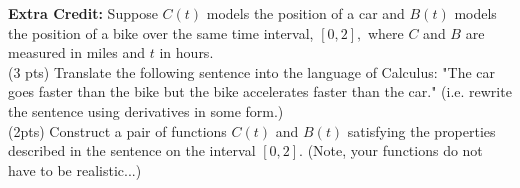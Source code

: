 \documentclass[12pt]{article}
\begin{document}
\textbf{Extra Credit:} Suppose $C(t)$ models the position of a car and $B(t)$ models the position of a bike over the same time interval, $[0,2],$ where $C$ and $B$ are measured in miles and $t$ in hours.\\
(3 pts) Translate the following sentence into the language of Calculus: "The car goes faster than the bike but the bike accelerates faster than the car." (i.e. rewrite the sentence using derivatives in some form.)\\
(2pts) Construct a pair of functions $C(t)$ and $B(t)$ satisfying the properties described in the sentence on the interval $[0,2].$ (Note, your functions do not have to be realistic...)

\vspace{4in}
\end{document}
